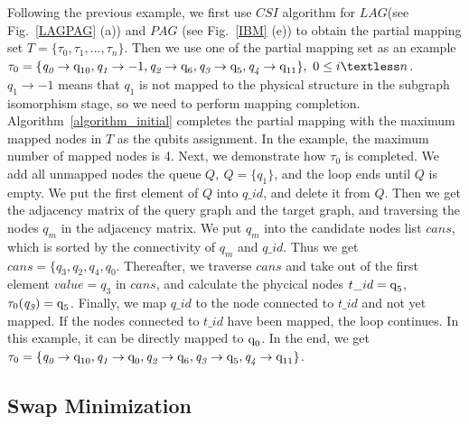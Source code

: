 \documentclass[runningheads]{llncs}
\begin{document}
	\begin{example}
		Following the previous example, we first use  $CSI$ algorithm for $LAG$(see Fig.~\ref{LAGPAG} (a)) and $PAG$ (see Fig.~\ref{IBM} (e)) to obtain the partial mapping set $T=\{\tau_{0},\tau_{1},...,\tau_{n}\}$. Then we use one of the partial mapping set as an example
$\tau_{0}=\{\textit{q}_\textit{0}\rightarrow \textup{q}_{\textup{10}},\textit{q}_\textit{1}\rightarrow -1,
	\textit{q}_\textit{2}\rightarrow \textup{q}_{\textup{6}},\textit{q}_\textit{3}\rightarrow \textup{q}_{\textup{5}},\textit{q}_\textit{4}\rightarrow \textup{q}_{\textup{11}}\}, \ 0 \le i \textless n$. 
	$\textit{q}_\textit{1}\rightarrow -1$ means that $\textit{q}_\textit{1}$ is not mapped to the physical structure in the subgraph isomorphism stage,	so we need to perform mapping completion. Algorithm~\ref{algorithm_initial} completes the partial mapping with the maximum mapped nodes in $T$ as the qubits assignment. In the example, the maximum number of mapped nodes is 4. Next, we demonstrate how $\tau_{0}$ is completed. We add all unmapped nodes the queue $Q, \ Q=\{\textit{q}_\textit{1}\}$, and the loop ends until $Q$ is empty. We put the first element of $Q$ into $q\_id$, and delete it from $Q$.  
	Then we get the adjacency matrix of the query graph and the target graph, and traversing the nodes $\textit{q}_\textit{m}$ in the adjacency matrix. We put $\textit{q}_\textit{m}$ into the candidate nodes list $cans$, which is sorted by the connectivity of $\textit{q}_\textit{m}$ and $q\_id$. Thus we get $cans=\{\textit{q}_\textit{3},\textit{q}_\textit{2},\textit{q}_\textit{4},\textit{q}_\textit{0}$.	Thereafter, we traverse $cans$ and take out of the first element $value=\textit{q}_\textit{3}$ in $cans$, and calculate the phycical nodes $t\_id=\textup{q}_{\textup{5}}$, $\tau_0(\textit{q}_\textit{3})=\textup{q}_{\textup{5}}$. Finally, we map $q\_id$ to the node connected to $t\_id$ and not yet mapped. If the nodes connected to $t\_id$ have been mapped, the loop continues. In this example, it can be directly mapped to $\textup{q}_{\textup{0}}$. In the end, we get $ \tau_{0}=\{\textit{q}_\textit{0}\rightarrow  \textup{q}_{10},\textit{q}_\textit{1}\rightarrow \textup{q}_{0},	\textit{q}_\textit{2}\rightarrow  \textup{q}_{\textup{6}},\textit{q}_\textit{3}\rightarrow  \textup{q}_{\textup{5}},\textit{q}_\textit{4}\rightarrow  \textup{q}_{\textup{11}}\}$.
	\end{example}
\subsection{Swap Minimization}
\end{document}
